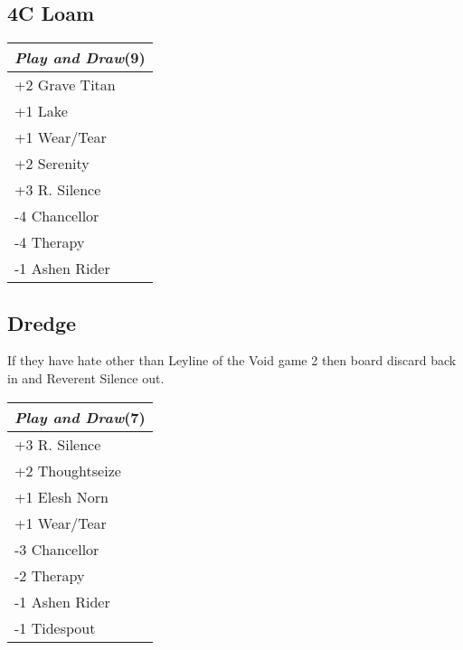 \documentclass{article}
\renewcommand *\contentsname{Contents}
\begin{document}
\begin{multicols}{2}
\subsection*{4C Loam}
\begin{center}
\begin{tabular}{| l |}
\hline
\textit{Play and Draw}(9) \\
\hline
\cellcolor[HTML]{BBDDBB}\small{+2 Grave Titan}\\
\cellcolor[HTML]{BBDDBB}\small{+1 Lake}\\
\cellcolor[HTML]{BBDDBB}\small{+1 Wear/Tear}\\
\cellcolor[HTML]{BBDDBB}\small{+2 Serenity}\\
\cellcolor[HTML]{BBDDBB}\small{+3 R. Silence}\\
\cellcolor[HTML]{DDBBBB}\small{-4 Chancellor}\\
\cellcolor[HTML]{DDBBBB}\small{-4 Therapy}\\
\cellcolor[HTML]{DDBBBB}\small{-1 Ashen Rider}\\
\hline
\end{tabular}
\end{center}
\subsection*{Dredge}
If they have hate other than Leyline of the Void game 2 then board discard back in and Reverent Silence out.\begin{center}
\begin{tabular}{| l |}
\hline
\textit{Play and Draw}(7) \\
\hline
\cellcolor[HTML]{BBDDBB}\small{+3 R. Silence}\\
\cellcolor[HTML]{BBDDBB}\small{+2 Thoughtseize}\\
\cellcolor[HTML]{BBDDBB}\small{+1 Elesh Norn}\\
\cellcolor[HTML]{BBDDBB}\small{+1 Wear/Tear}\\
\cellcolor[HTML]{DDBBBB}\small{-3 Chancellor}\\
\cellcolor[HTML]{DDBBBB}\small{-2 Therapy}\\
\cellcolor[HTML]{DDBBBB}\small{-1 Ashen Rider}\\
\cellcolor[HTML]{DDBBBB}\small{-1 Tidespout}\\
\hline
\end{tabular}
\end{center}

\end{multicols}
\end{document}
